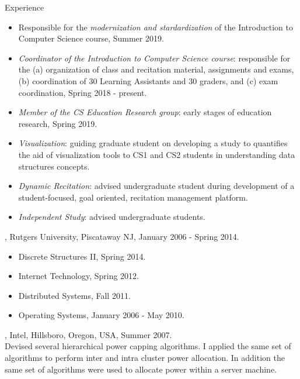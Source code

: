 \documentclass[10pt]{resume}
\begin{document}
\begin{category}{Experience}
    \begin{itemize}
    \item Responsible for the {\em modernization and stardardization} of the
      Introduction to Computer Science course, Summer 2019.
    \item {\em Coordinator of the Introduction to Computer Science course}:
      responsible for the (a) organization of class and recitation
      material, assignments and exams, (b) coordination of 30 Learning
      Assistants and 30 graders, and (c) exam coordination, Spring 2018 - present.
    \end{itemize}
    \begin{itemize}
      \item {\em Member of the CS Education Research group}: early
        stages of education research, Spring 2019.
      \item {\em Visualization}: guiding graduate student on
        developing a study to quantifies the aid of visualization
        tools to CS1 and CS2 students in understanding data structures
        concepts.
      \item {\em Dynamic Recitation}: advised undergraduate student
        during development of a student-focused, goal oriented,
        recitation management platform.
    \item {\em Independent Study}: advised undergraduate students. 
    \end{itemize}

  
  , Rutgers University, Piscataway NJ, January 2006 - Spring 2014.
  \begin{itemize}
    \item Discrete Structures II, Spring 2014.
    \item Internet Technology, Spring 2012.
    \item Distributed Systems, Fall 2011.
    \item Operating Systems, January 2006 - May 2010.
  \end{itemize}

  , Intel, Hillsboro, Oregon, USA, Summer 2007.\\
  Devised several hierarchical power capping algorithms. I applied the same
  set of algorithms to perform inter and intra cluster power allocation. In addition
  the same set of algorithms were used to allocate power within a server machine.


\end{category}
\end{document}
